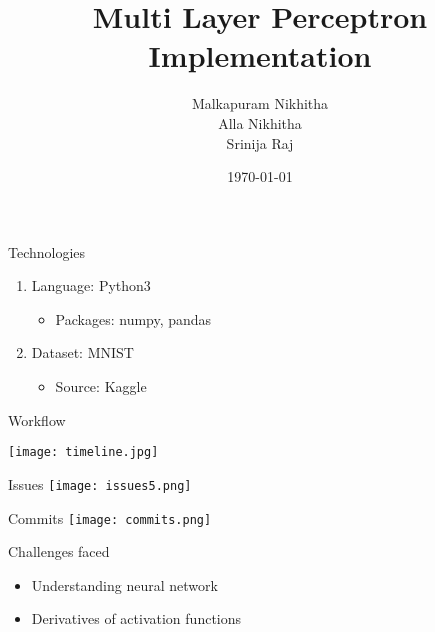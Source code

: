 \documentclass{beamer}
\title[Multi Layer Perceptron]{Multi Layer Perceptron \\ Implementation }
\author[Srinija Raj, A Nikhitha, M Nikhitha]{ Malkapuram Nikhitha \\ Alla Nikhitha \\ Srinija Raj}
\institute[WE]{ TalentSprint - WE program }
\date{\today}
\begin{document}
\begin{frame}
  \titlepage
\end{frame}

\begin{frame}{Technologies}
    \begin{enumerate}
        \item Language: Python3
        \vspace{10pt}
        \begin{itemize}
             \item Packages: numpy, pandas
        \end{itemize}
        \vspace{20pt}
      
       \item  Dataset: MNIST 
        \vspace{10pt}
        \begin{itemize}
            \item Source: Kaggle
        \end{itemize}
    \end{enumerate}
\end{frame}
 
\begin{frame}{Workflow}
  \begin{center}
     \texttt{[image: timeline.jpg]}
  \end{center}
\end{frame}

\begin{frame}{Issues}
\texttt{[image: issues5.png]}
\end{frame}

\begin{frame}{Commits}
\texttt{[image: commits.png]}
\end{frame}

\begin{frame}{Challenges faced}
    \begin{itemize}
        \item Understanding neural network
        \vspace{10pt}
        \vspace{10pt}
        \item Derivatives of activation functions
    \end{itemize}
\end{frame}
\end{document}
